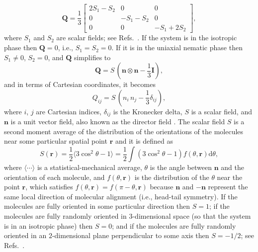 \documentclass[nottitlepage]{article}
\begin{document}
\begin{equation}\label{eq:Q111}
\mathbf{Q}=\frac{1}{3}
  \begin{bmatrix}
    2S_1-S_2 & 0 & 0  \\
    0 & -S_1-S_2 & 0 \\
    0 & 0 & -S_1+2S_2
  \end{bmatrix},
\end{equation}
where $S_1$ and $S_2$ are scalar fields; see Refs.~\cite{Mottram, de gennes, lubensky}. If the system is in the isotropic phase then $\mathbf{Q}=0$, i.e., $S_1=S_2=0$. If it is in the uniaxial nematic phase then $S_1\neq 0$, $S_2=0$,  and $\mathbf{Q}$ simplifies to
\begin{equation} \label{eq:Q22}
\mathbf{Q}=S\,(\mathbf{n}\otimes \mathbf{n}-\frac{1}{3}\mathbf{I}),
 \end{equation}
 and in terms of Cartesian coordinates, it becomes
\begin{equation}\label{eq:Q}
Q_{ij}=S \,(n_i\,n_j-\frac{1}{3}\delta_{ij}),
\end{equation}
where $i$, $j$ are Cartesian indices, $\delta_{ij}$ is the Kronecker delta, $S$ is a scalar field, and $\mathbf{n}$ is a unit vector field, also known as the director field \cite{de gennes}. The scalar field $S$ is a second moment average of the distribution of the orientations of the molecules near some particular spatial point $\mathbf{r}$ and it is defined as
\begin{equation}\label{eq:Q2}
S(\mathbf{r})=\frac{1}{2}\langle 3\cos^{2}\theta-1\rangle=\frac{1}{2}\int (3\cos^{2}\theta-1)f(\theta,\mathbf{r})\mathrm{d}\theta,
 \end{equation}
where $\langle\cdots\rangle$ is a statistical-mechanical average, $\theta$ is the angle between $\mathbf{n}$ and the orientation of each molecule, and $f(\theta,\mathbf{r})$ is the distribution of the $\theta$ near the point $\mathbf{r}$, which satisfies $f(\theta,\mathbf{r})=f(\pi-\theta,\mathbf{r})$ because $\mathbf{n}$ and $-\mathbf{n}$ represent the same local direction of molecular alignment (i.e., head-tail symmetry). %
If the molecules are fully oriented in some particular direction then $S=1$;   if the molecules are fully randomly oriented in $3$-dimensional space (so that the system is in an isotropic phase) then $S=0$; and if the molecules are fully randomly oriented in an $2$-dimensional plane perpendicular to some axis then $S=-1/2$; see Refs.~\cite{Mottram, de gennes}. %
\end{document}
